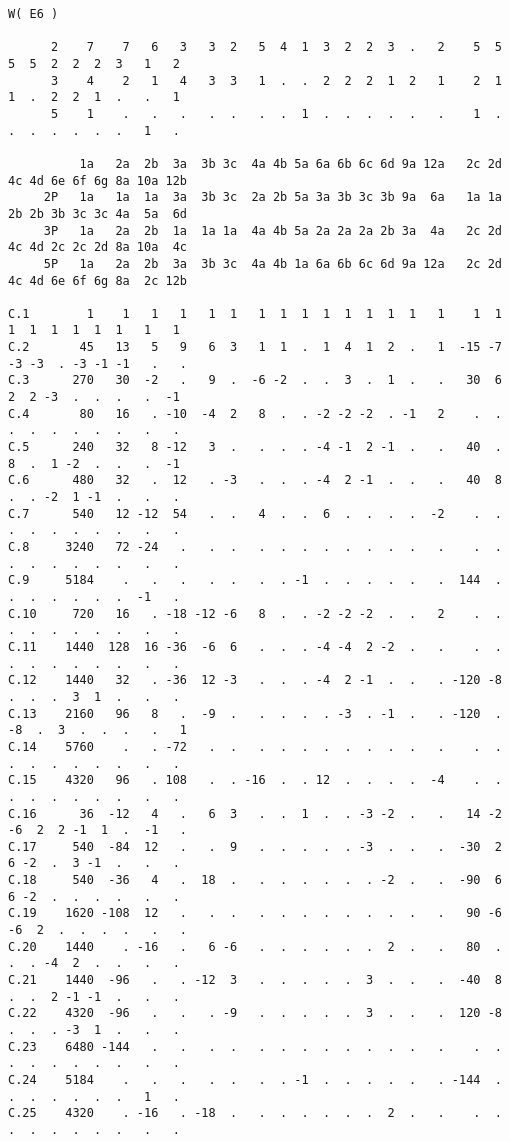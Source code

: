 \documentclass[10pt]{article}
\begin{document}
 \mbox{}
\scriptsize

\begin{verbatim}
W( E6 )

      2    7    7   6   3   3  2   5  4  1  3  2  2  3  .   2    5  5  5  5  2  2  2  3   1   2
      3    4    2   1   4   3  3   1  .  .  2  2  2  1  2   1    2  1  1  .  2  2  1  .   .   1
      5    1    .   .   .   .  .   .  .  1  .  .  .  .  .   .    1  .  .  .  .  .  .  .   1   .

          1a   2a  2b  3a  3b 3c  4a 4b 5a 6a 6b 6c 6d 9a 12a   2c 2d 4c 4d 6e 6f 6g 8a 10a 12b
     2P   1a   1a  1a  3a  3b 3c  2a 2b 5a 3a 3b 3c 3b 9a  6a   1a 1a 2b 2b 3b 3c 3c 4a  5a  6d
     3P   1a   2a  2b  1a  1a 1a  4a 4b 5a 2a 2a 2a 2b 3a  4a   2c 2d 4c 4d 2c 2c 2d 8a 10a  4c
     5P   1a   2a  2b  3a  3b 3c  4a 4b 1a 6a 6b 6c 6d 9a 12a   2c 2d 4c 4d 6e 6f 6g 8a  2c 12b

C.1        1    1   1   1   1  1   1  1  1  1  1  1  1  1   1    1  1  1  1  1  1  1  1   1   1
C.2       45   13   5   9   6  3   1  1  .  1  4  1  2  .   1  -15 -7 -3 -3  . -3 -1 -1   .   .
C.3      270   30  -2   .   9  .  -6 -2  .  .  3  .  1  .   .   30  6  2  2 -3  .  .  .   .  -1
C.4       80   16   . -10  -4  2   8  .  . -2 -2 -2  . -1   2    .  .  .  .  .  .  .  .   .   .
C.5      240   32   8 -12   3  .   .  .  . -4 -1  2 -1  .   .   40  .  8  .  1 -2  .  .   .  -1
C.6      480   32   .  12   . -3   .  .  . -4  2 -1  .  .   .   40  8  .  . -2  1 -1  .   .   .
C.7      540   12 -12  54   .  .   4  .  .  6  .  .  .  .  -2    .  .  .  .  .  .  .  .   .   .
C.8     3240   72 -24   .   .  .   .  .  .  .  .  .  .  .   .    .  .  .  .  .  .  .  .   .   .
C.9     5184    .   .   .   .  .   .  . -1  .  .  .  .  .   .  144  .  .  .  .  .  .  .  -1   .
C.10     720   16   . -18 -12 -6   8  .  . -2 -2 -2  .  .   2    .  .  .  .  .  .  .  .   .   .
C.11    1440  128  16 -36  -6  6   .  .  . -4 -4  2 -2  .   .    .  .  .  .  .  .  .  .   .   .
C.12    1440   32   . -36  12 -3   .  .  . -4  2 -1  .  .   . -120 -8  .  .  .  3  1  .   .   .
C.13    2160   96   8   .  -9  .   .  .  .  . -3  . -1  .   . -120  . -8  .  3  .  .  .   .   1
C.14    5760    .   . -72   .  .   .  .  .  .  .  .  .  .   .    .  .  .  .  .  .  .  .   .   .
C.15    4320   96   . 108   .  . -16  .  . 12  .  .  .  .  -4    .  .  .  .  .  .  .  .   .   .
C.16      36  -12   4   .   6  3   .  .  1  .  . -3 -2  .   .   14 -2 -6  2  2 -1  1  .  -1   .
C.17     540  -84  12   .   .  9   .  .  .  .  . -3  .  .   .  -30  2  6 -2  .  3 -1  .   .   .
C.18     540  -36   4   .  18  .   .  .  .  .  .  . -2  .   .  -90  6  6 -2  .  .  .  .   .   .
C.19    1620 -108  12   .   .  .   .  .  .  .  .  .  .  .   .   90 -6 -6  2  .  .  .  .   .   .
C.20    1440    . -16   .   6 -6   .  .  .  .  .  .  2  .   .   80  .  .  . -4  2  .  .   .   .
C.21    1440  -96   .   . -12  3   .  .  .  .  .  3  .  .   .  -40  8  .  .  2 -1 -1  .   .   .
C.22    4320  -96   .   .   . -9   .  .  .  .  .  3  .  .   .  120 -8  .  .  . -3  1  .   .   .
C.23    6480 -144   .   .   .  .   .  .  .  .  .  .  .  .   .    .  .  .  .  .  .  .  .   .   .
C.24    5184    .   .   .   .  .   .  . -1  .  .  .  .  .   . -144  .  .  .  .  .  .  .   1   .
C.25    4320    . -16   . -18  .   .  .  .  .  .  .  2  .   .    .  .  .  .  .  .  .  .   .   .
\end{verbatim}
\end{document}
